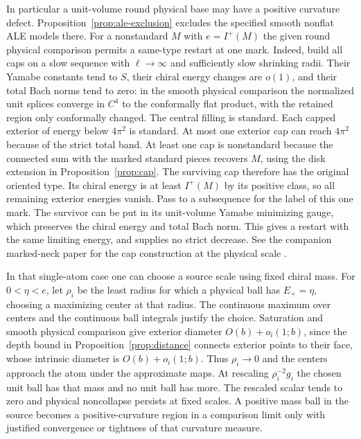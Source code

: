 \documentclass[11pt]{article}
\theoremstyle{definition}
\theoremstyle{remark}
\begin{document}
In particular a unit-volume round physical base may have a positive curvature defect. Proposition~\ref{prop:ale-exclusion} excludes the specified smooth nonflat ALE models there. For a nonstandard \(M\) with \(e=I^+(M)\) the given round physical comparison permits a same-type restart at one mark. Indeed, build all caps on a slow sequence with \(\ell\to\infty\) and sufficiently slow shrinking radii. Their Yamabe constants tend to \(S\), their chiral energy changes are \(o(1)\), and their total Bach norms tend to zero: in the smooth physical comparison the normalized unit splices converge in \(C^4\) to the conformally flat product, with the retained region only conformally changed. The central filling is standard. Each capped exterior of energy below \(4\pi^2\) is standard. At most one exterior cap can reach \(4\pi^2\) because of the strict total band. At least one cap is nonstandard because the connected sum with the marked standard pieces recovers \(M\), using the disk extension in Proposition~\ref{prop:cap}. The surviving cap therefore has the original oriented type. Its chiral energy is at least \(I^+(M)\) by its positive class, so all remaining exterior energies vanish. Pass to a subsequence for the label of this one mark. The survivor can be put in its unit-volume Yamabe minimizing gauge, which preserves the chiral energy and total Bach norm. This gives a restart with the same limiting energy, and supplies no strict decrease. See the companion marked-neck paper for the cap construction at the physical scale \cite{Baker2026MarkedNecks}.

In that single-atom case one can choose a source scale using fixed chiral mass. For \(0<\eta<e\), let \(\rho_i\) be the least radius for which a physical ball has \(E_+=\eta\), choosing a maximizing center at that radius. The continuous maximum over centers and the continuous ball integrals justify the choice. Saturation and smooth physical comparison give exterior diameter \(O(b)+o_i(1;b)\), since the depth bound in Proposition~\ref{prop:distance} connects exterior points to their face, whose intrinsic diameter is \(O(b)+o_i(1;b)\). Thus \(\rho_i\to0\) and the centers approach the atom under the approximate maps. At rescaling \(\rho_i^{-2}g_i\) the chosen unit ball has that mass and no unit ball has more. The rescaled scalar tends to zero and physical noncollapse persists at fixed scales. A positive mass ball in the source becomes a positive-curvature region in a comparison limit only with justified convergence or tightness of that curvature measure.
\end{document}
